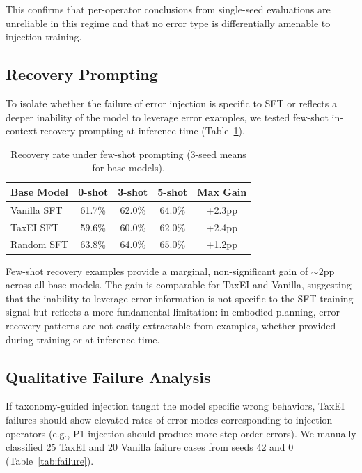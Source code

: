 \documentclass[11pt,a4paper]{article}
\begin{document}
This confirms that per-operator conclusions from single-seed evaluations are unreliable in this regime and that no error type is differentially amenable to injection training.

\subsection{Recovery Prompting}\label{sec:recovery}

To isolate whether the failure of error injection is specific to SFT or reflects a deeper inability of the model to leverage error examples, we tested few-shot in-context recovery prompting at inference time (Table~\ref{tab:fewshot}).

\begin{table}[h]
\centering
\caption{Recovery rate under few-shot prompting (3-seed means for base models).}
\label{tab:fewshot}
\begin{tabular}{lcccc}
\toprule
\textbf{Base Model} & \textbf{0-shot} & \textbf{3-shot} & \textbf{5-shot} & \textbf{Max Gain} \\
\midrule
Vanilla SFT & 61.7\% & 62.0\% & 64.0\% & +2.3pp \\
TaxEI SFT   & 59.6\% & 60.0\% & 62.0\% & +2.4pp \\
Random SFT  & 63.8\% & 64.0\% & 65.0\% & +1.2pp \\
\bottomrule
\end{tabular}
\end{table}

Few-shot recovery examples provide a marginal, non-significant gain of ${\sim}2$pp across all base models.
The gain is comparable for TaxEI and Vanilla, suggesting that the inability to leverage error information is not specific to the SFT training signal but reflects a more fundamental limitation: in embodied planning, error-recovery patterns are not easily extractable from examples, whether provided during training or at inference time.

\subsection{Qualitative Failure Analysis}\label{sec:qualitative}

If taxonomy-guided injection taught the model specific wrong behaviors, TaxEI failures should show elevated rates of error modes corresponding to injection operators (e.g., P1 injection should produce more step-order errors).
We manually classified 25 TaxEI and 20 Vanilla failure cases from seeds 42 and 0 (Table~\ref{tab:failure}).
\end{document}
